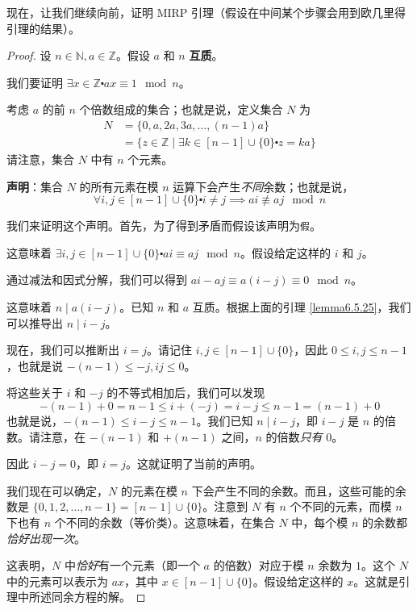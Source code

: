 现在，让我们继续向前，证明 MIRP 引理（假设在中间某个步骤会用到欧几里得引理的结果）。

\begin{proof}
    设 $n \in \mathbb{N}, a \in \mathbb{Z}$。假设 $a$ 和 $n$ \textbf{互质}。
    
    我们要证明 $\exists x \in \mathbb{Z} \centerdot ax \equiv 1 \mod n$。

    考虑 $a$ 的前 $n$ 个倍数组成的集合；也就是说，定义集合 $N$ 为
    \begin{align*}
        N &= \{0, a, 2a, 3a, \dots ,(n-1)a\} \\
        &= \{z \in \mathbb{Z} \mid \exists k \in [n - 1] \cup \{0\} \centerdot z = ka\}
    \end{align*}
    请注意，集合 $N$ 中有 $n$ 个元素。

    \textbf{声明}：集合 $N$ 的所有元素在模 $n$ 运算下会产生\emph{不同}余数；也就是说，
    \[\forall i, j \in [n-1] \cup \{0\} \centerdot i \ne j \implies ai \not\equiv aj \mod n\]

    我们来证明这个声明。首先，为了得到矛盾而假设该声明为\verb|假|。

    这意味着 $\exists i, j \in [n-1] \cup \{0\} \centerdot ai \equiv aj \mod n$。假设给定这样的 $i$ 和 $j$。

    通过减法和因式分解，我们可以得到 $ai - aj \equiv a(i-j) \equiv 0 \mod n$。

    这意味着 $n \mid a(i-j)$。已知 $n$ 和 $a$ 互质。根据上面的引理 \ref{lemma6.5.25}，我们可以推导出 $n \mid i-j$。

    现在，我们可以推断出 $i = j$。请记住 $i, j \in [n-1] \cup \{0\}$，因此 $0 \le i, j \le n-1$，也就是说 $-(n-1) \le -j, ij \le 0$。

    将这些关于 $i$ 和 $-j$ 的不等式相加后，我们可以发现
    \[-(n-1) + 0 = n-1 \le i + (-j) = i - j \le n - 1 = (n-1) + 0\]
    也就是说，$-(n-1) \le i-j \le n-1$。我们已知 $n \mid i - j$，即 $i-j$ 是 $n$ 的倍数。请注意，在 $-(n-1)$ 和 $+(n-1)$ 之间，$n$ 的倍数\emph{只有} $0$。

    因此 $i-j=0$，即 $i=j$。这就证明了当前的声明。

    我们现在可以确定，$N$ 的元素在模 $n$ 下会产生不同的余数。而且，这些可能的余数是 $\{0, 1, 2, \dots, n-1\} = [n-1] \cup \{0\}$。注意到 $N$ 有 $n$ 个不同的元素，而模 $n$ 下也有 $n$ 个不同的余数（等价类）。这意味着，在集合 $N$ 中，每个模 $n$ 的余数都\emph{恰好出现一次}。

    这表明，$N$ 中\emph{恰好}有一个元素（即一个 $a$ 的倍数）对应于模 $n$ 余数为 $1$。这个 $N$ 中的元素可以表示为 $ax$，其中 $x \in [n-1] \cup \{0\}$。假设给定这样的 $x$。这就是引理中所述同余方程的解。
\end{proof}

